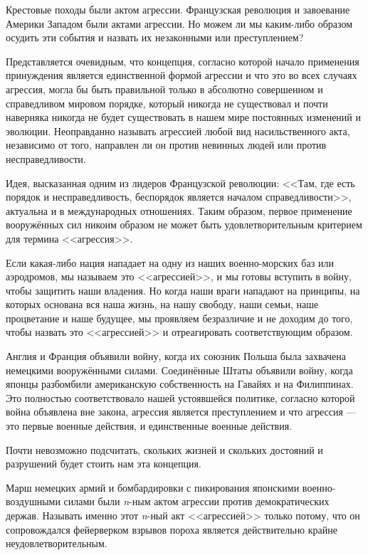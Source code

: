 Крестовые походы были актом агрессии. Французская революция и завоевание Америки Западом были актами агрессии. Но можем ли мы каким-либо образом осудить эти события и назвать их незаконными или преступлением?
 
Представляется очевидным, что концепция, согласно которой начало применения принуждения является единственной формой агрессии и что это во всех случаях агрессия, могла бы быть правильной только в абсолютно совершенном и справедливом мировом порядке, который никогда не существовал и почти наверняка никогда не будет существовать в нашем мире постоянных изменений и эволюции. Неоправданно называть агрессией любой вид насильственного акта, независимо от того, направлен ли он против невинных людей или против несправедливости.

Идея, высказанная одним из лидеров Французской революции: <<Там, где есть порядок и несправедливость, беспорядок является началом справедливости>>, актуальна и в международных отношениях. Таким образом, первое применение вооружённых сил никоим образом не может быть удовлетворительным критерием для термина <<агрессия>>.
 
Если какая-либо нация нападает на одну из наших военно-морских баз или аэродромов, мы называем это <<агрессией>>, и мы готовы вступить в войну, чтобы защитить наши владения. Но когда наши враги нападают на принципы, на которых основана вся наша жизнь, на нашу свободу, наши семьи, наше процветание и наше будущее, мы проявляем безразличие и не доходим до того, чтобы назвать это <<агрессией>> и отреагировать соответствующим образом.

Англия и Франция объявили войну, когда их союзник Польша была захвачена немецкими вооружёнными силами. Соединённые Штаты объявили войну, когда японцы разбомбили американскую собственность на Гавайях и на Филиппинах. Это полностью соответствовало нашей устоявшейся политике, согласно которой война объявлена вне закона, агрессия является преступлением и что агрессия — это первые военные действия, и единственные военные действия.
 
Почти невозможно подсчитать, скольких жизней и скольких достояний и разрушений будет стоить нам эта концепция.

Марш немецких армий и бомбардировки с пикирования японскими военно-воздушными силами были \textit{n}-ным актом агрессии против демократических держав. Называть именно этот \textit{n}-ный акт <<агрессией>> только потому, что он сопровождался фейерверком взрывов пороха является действительно крайне неудовлетворительным.
 
